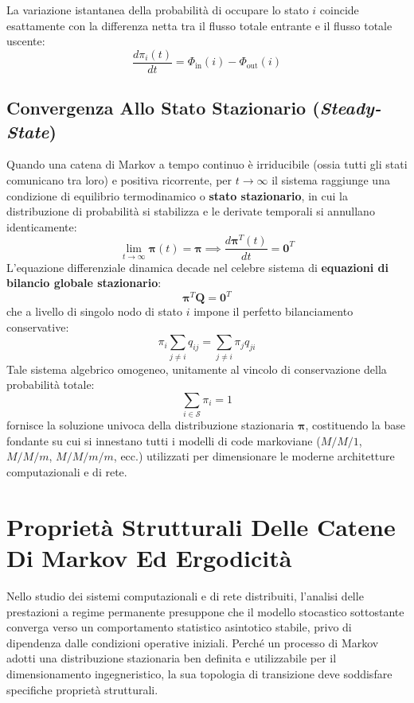 \documentclass[11pt, a4paper]{article}
\begin{document}
La variazione istantanea della probabilità di occupare lo stato $i$ coincide esattamente con la differenza netta tra il flusso totale entrante e il flusso totale uscente:
\[
    \boxed{\frac{d \pi_i(t)}{dt} = \Phi_{\text{in}}(i) - \Phi_{\text{out}}(i)}
\]

\subsection{Convergenza Allo Stato Stazionario (\emph{Steady-State})}

Quando una catena di Markov a tempo continuo è irriducibile (ossia tutti gli stati comunicano tra loro) e positiva ricorrente, per $t \to \infty$ il sistema raggiunge una condizione di equilibrio termodinamico o \textbf{stato stazionario}, in cui la distribuzione di probabilità si stabilizza e le derivate temporali si annullano identicamente:
\[
    \lim_{t \to \infty} \bm{\pi}(t) = \bm{\pi} \implies \frac{d \bm{\pi}^T(t)}{dt} = \bm{0}^T
\]
L'equazione differenziale dinamica decade nel celebre sistema di \textbf{equazioni di bilancio globale stazionario}:
\[
    \boxed{\bm{\pi}^T \bm{Q} = \bm{0}^T}
\]
che a livello di singolo nodo di stato $i$ impone il perfetto bilanciamento conservative:
\[
    \boxed{\pi_i \sum_{j \neq i} q_{ij} = \sum_{j \neq i} \pi_j q_{ji}}
\]
Tale sistema algebrico omogeneo, unitamente al vincolo di conservazione della probabilità totale:
\[
    \sum_{i \in \mathcal{S}} \pi_i = 1
\]
fornisce la soluzione univoca della distribuzione stazionaria $\bm{\pi}$, costituendo la base fondante su cui si innestano tutti i modelli di code markoviane ($M/M/1$, $M/M/m$, $M/M/m/m$, ecc.) utilizzati per dimensionare le moderne architetture computazionali e di rete.



\section{Proprietà Strutturali Delle Catene Di Markov Ed Ergodicità}

Nello studio dei sistemi computazionali e di rete distribuiti, l'analisi delle prestazioni a regime permanente presuppone che il modello stocastico sottostante converga verso un comportamento statistico asintotico stabile, privo di dipendenza dalle condizioni operative iniziali. Perché un processo di Markov adotti una distribuzione stazionaria ben definita e utilizzabile per il dimensionamento ingegneristico, la sua topologia di transizione deve soddisfare specifiche proprietà strutturali.
\end{document}
